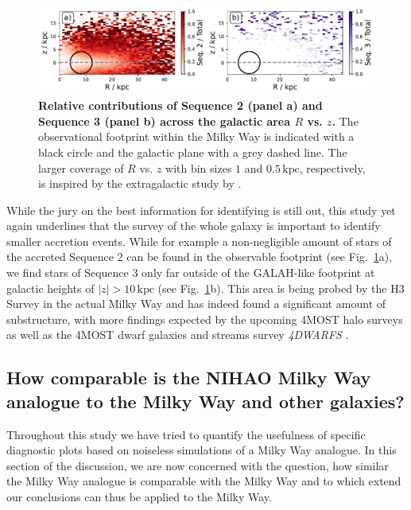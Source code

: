 \documentclass[fleqn,usenatbib]{mnras}
\begin{document}
\begin{figure}
	\includegraphics[width=\textwidth]{figures/accretion_rates.pdf}
    \caption{
    \textbf{Relative contributions of Sequence 2 (panel a) and Sequence 3 (panel b) across the galactic area $R$ vs. $z$.} The observational footprint within the Milky Way is indicated with a black circle and the galactic plane with a grey dashed line. The larger coverage of $R$ vs. $z$ with bin sizes $1$ and $0.5\,\mathrm{kpc}$, respectively, is inspired by the extragalactic study by \citet[][their Fig.~16]{Martig2021}.
    }
    \label{fig:accretion_rate}
\end{figure}

While the jury on the best information for identifying is still out, this study yet again underlines that the survey of the whole galaxy is important to identify smaller accretion events. While for example a non-negligible amount of stars of the accreted Sequence 2 can be found in the observable footprint (see Fig.~\ref{fig:accretion_rate}a), we find stars of Sequence 3 only far outside of the GALAH-like footprint at galactic heights of $\vert z \vert > 10\,\mathrm{kpc}$ (see Fig.~\ref{fig:accretion_rate}b). This area is being probed by the H3 Survey \citep{Conroy2019} in the actual Milky Way and has indeed found a significant amount of substructure, with more findings expected by the upcoming 4MOST halo surveys \citep{4MOST_HR_Halo, 4MOST_LR_Halo} as well as the 4MOST dwarf galaxies and streams survey \textit{4DWARFS} \citep{4DWARFS2023}.

\subsection{How comparable is the NIHAO Milky Way analogue to the Milky Way and other galaxies?} \label{sec:discussion_how_comparable_are_nihao_and_milkyway}

Throughout this study we have tried to quantify the usefulness of specific diagnostic plots based on noiseless simulations of a Milky Way analogue. In this section of the discussion, we are now concerned with the question, how similar the Milky Way analogue is comparable with the Milky Way and to which extend our conclusions can thus be applied to the Milky Way.
\end{document}
